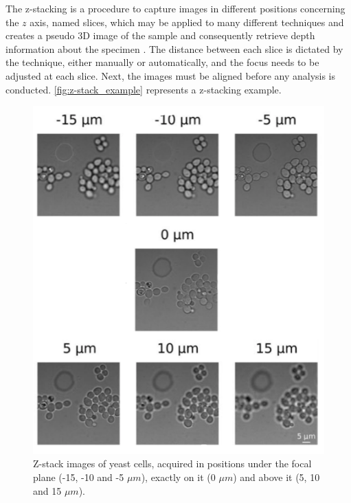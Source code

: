 The z-stacking is a procedure to capture images in different positions concerning the $z$ axis, named slices, which may be applied to many different techniques and creates a pseudo 3D image of the sample and consequently retrieve depth information about the specimen \cite{lawlor2019introduction}. The distance between each slice is dictated by the technique, either manually or automatically, and the focus needs to be adjusted at each slice. Next, the images must be aligned before any analysis is conducted. \autoref{fig:z-stack_example} represents a z-stacking example.

\begin{figure}[H]
	\centering
	\caption{\label{fig:z-stack_example} Z-stack images of yeast cells, acquired in positions under the focal plane (-15, -10 and -5 $\mu m$), exactly on it (0 $\mu m$) and above it (5, 10 and 15 $\mu m$).}
	\begin{center}
	    \includegraphics[scale=0.5]{images/z-stack.png}
	\end{center}
	\centering
\end{figure}